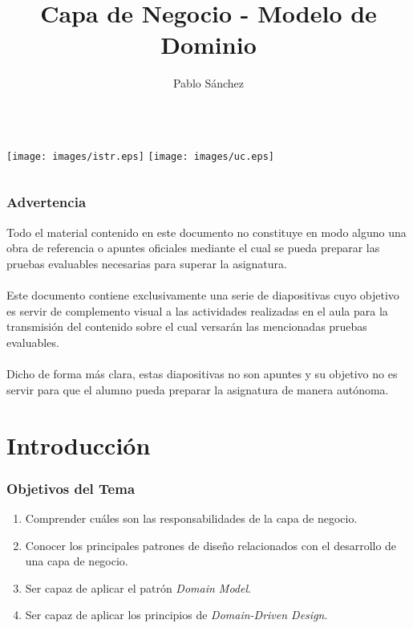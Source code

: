 \documentclass[handout,a4paper,slidestop,xcolor=pst,blue]{beamer}
\title[Modelo de Dominio]{Capa de Negocio - Modelo de Dominio}
\author[P. Sanchez]{\alert{Pablo Sánchez}}
\institute[IIE]{
		   Dpto. Ingeniería Informática y Electrónica \\
		   Universidad de Cantabria \\
		   Santander (Cantabria, España) \\
		   \texttt{p.sanchez@unican.es}
}
\date{}
\begin{document}
\begin{frame}[c]
	\titlepage
	\begin{columns}
			\centering
   		     \texttt{[image: images/istr.eps]}
			\centering
			\texttt{[image: images/uc.eps]}
	\end{columns}
\end{frame}

\begin{frame}[c]
	\frametitle{\alert{Advertencia}}
	\begin{center}
	Todo el material contenido en este documento no constituye en modo alguno una obra de referencia o apuntes oficiales mediante el cual se pueda preparar las pruebas evaluables necesarias para superar la asignatura. 
	\ \\ \ \\
	Este documento contiene exclusivamente una serie de diapositivas cuyo objetivo es servir de complemento visual a las actividades realizadas en el aula para la transmisión del contenido sobre el cual versarán las mencionadas pruebas evaluables.  
	\ \\ \ \\
	Dicho de forma más clara, \alert{estas diapositivas no son apuntes y su objetivo no es servir para que el alumno pueda preparar la asignatura de manera autónoma.}
	\end{center}
\end{frame}

\section{Introducción}

\begin{frame}[c]
    \frametitle{Objetivos del Tema}
    \begin{enumerate}[<+->]
         \item Comprender cuáles son las responsabilidades de la capa de negocio.
         \item Conocer los principales patrones de diseño relacionados con el desarrollo de una capa de negocio.
         \item Ser capaz de aplicar el patrón \emph{Domain Model}.
         \item Ser capaz de aplicar los principios de \emph{Domain-Driven Design}.
    \end{enumerate}
\end{frame}
\end{document}
